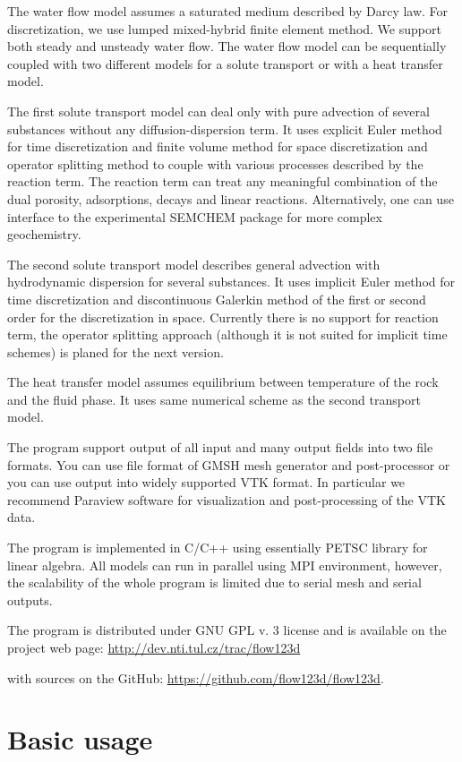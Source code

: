 \documentclass[12pt,a4paper]{report}
\begin{document}
The water flow model assumes a saturated medium described by Darcy law. For discretization, we use lumped mixed-hybrid finite element method.
We support both steady and unsteady water flow. The water flow model can be sequentially coupled with two different models for a solute transport or with a heat transfer model.

The first solute transport model can deal only with pure advection of several substances without any diffusion-dispersion term. It uses 
explicit Euler method for time discretization and finite volume method for space discretization and operator splitting method to 
couple with various processes described by the reaction term. The reaction term can treat any meaningful combination of the dual porosity, adsorptions, decays and linear reactions.
Alternatively, one can use interface to the experimental SEMCHEM package for more complex geochemistry.

The second solute transport model describes general advection with hydrodynamic dispersion for several substances. It uses implicit Euler method for time discretization and discontinuous Galerkin method of
the first or second order for the discretization in space. Currently there is no support for reaction term, the operator splitting approach (although it is not suited for implicit time schemes) 
is planed for the next version.

The heat transfer model assumes equilibrium between temperature of the rock and the fluid phase. It uses same numerical scheme as the second transport model.

The program support output of all input and many output fields into two file formats. You can use file format of GMSH mesh generator and post-processor 
or you can use output into widely supported VTK format. In particular we recommend Paraview software for visualization and post-processing of the VTK data.

The program is implemented in C/C++ using essentially PETSC library for linear algebra. All models can run in parallel using MPI environment, however, 
the scalability of the whole program is limited due to serial mesh and serial outputs.


The program is distributed under GNU GPL v. 3 license and is available on the project web page:
\url{http://dev.nti.tul.cz/trac/flow123d}

with sources on the GitHub:
\url{https://github.com/flow123d/flow123d}.

\section{Basic usage}
\end{document}
